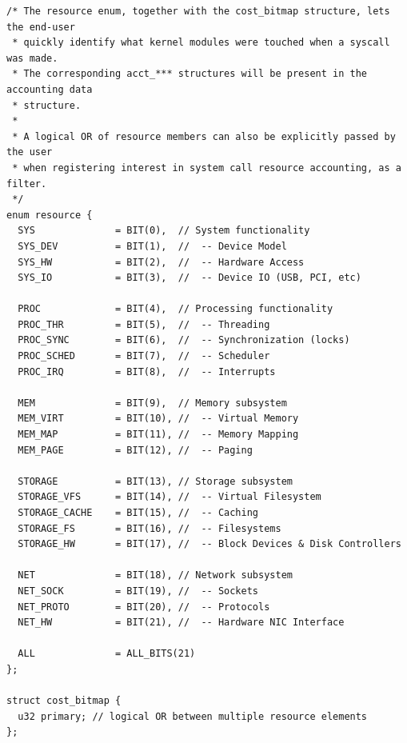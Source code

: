 \documentclass[12pt]{article}
\begin{document}
\vspace{1em}
\begin{lstlisting}
/* The resource enum, together with the cost_bitmap structure, lets the end-user
 * quickly identify what kernel modules were touched when a syscall was made.
 * The corresponding acct_*** structures will be present in the accounting data
 * structure.
 *
 * A logical OR of resource members can also be explicitly passed by the user
 * when registering interest in system call resource accounting, as a filter.
 */
enum resource {
  SYS              = BIT(0),  // System functionality
  SYS_DEV          = BIT(1),  //  -- Device Model
  SYS_HW           = BIT(2),  //  -- Hardware Access
  SYS_IO           = BIT(3),  //  -- Device IO (USB, PCI, etc)

  PROC             = BIT(4),  // Processing functionality
  PROC_THR         = BIT(5),  //  -- Threading
  PROC_SYNC        = BIT(6),  //  -- Synchronization (locks)
  PROC_SCHED       = BIT(7),  //  -- Scheduler
  PROC_IRQ         = BIT(8),  //  -- Interrupts

  MEM              = BIT(9),  // Memory subsystem
  MEM_VIRT         = BIT(10), //  -- Virtual Memory
  MEM_MAP          = BIT(11), //  -- Memory Mapping
  MEM_PAGE         = BIT(12), //  -- Paging

  STORAGE          = BIT(13), // Storage subsystem
  STORAGE_VFS      = BIT(14), //  -- Virtual Filesystem
  STORAGE_CACHE    = BIT(15), //  -- Caching
  STORAGE_FS       = BIT(16), //  -- Filesystems
  STORAGE_HW       = BIT(17), //  -- Block Devices & Disk Controllers

  NET              = BIT(18), // Network subsystem
  NET_SOCK         = BIT(19), //  -- Sockets
  NET_PROTO        = BIT(20), //  -- Protocols
  NET_HW           = BIT(21), //  -- Hardware NIC Interface

  ALL              = ALL_BITS(21)
};

struct cost_bitmap {
  u32 primary; // logical OR between multiple resource elements
};
\end{lstlisting}
\end{document}
